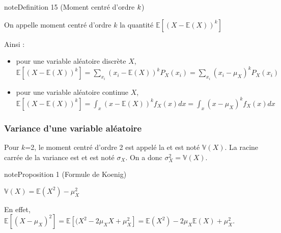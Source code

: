 \documentclass[letterpaper,10pt,french]{sphinxmanual}
\begin{document}
\ignorespaces \label{Rappels:definition-31}
\begin{sphinxadmonition}{note}{Definition 15 (Moment centré d’ordre \protect\(k\protect\))}



\sphinxAtStartPar
On appelle moment centré d’ordre \(k\) la quantité \(\mathbb{E}\left [(X-\mathbb{E}(X))^k \right]\)
\end{sphinxadmonition}

\sphinxAtStartPar
Ainsi :
\begin{itemize}
\item {} 
\sphinxAtStartPar
pour une variable aléatoire discrète \(X\), \(\mathbb{E}\left [(X-\mathbb{E}(X))^k \right] = \displaystyle\sum_{x_i} (x_i-\mathbb{E}(X))^k P_X(x_i) = \displaystyle\sum_{x_i} (x_i-\mu_X)^k P_X(x_i)\)

\item {} 
\sphinxAtStartPar
pour une variable aléatoire continue \(X\), \(\mathbb{E}\left [(X-\mathbb{E}(X))^k \right] = \int_x (x-\mathbb{E}(X))^k f_X(x)dx = \int_x (x-\mu_X)^k f_X(x)dx\)

\end{itemize}


\subsubsection{Variance d’une variable aléatoire}
\label{\detokenize{Rappels:variance-d-une-variable-aleatoire}}
\ignorespaces 
{}\ignorespaces 
\sphinxAtStartPar
Pour \(k\)=2, le moment centré d’ordre 2 est appelé la  et est noté \(\mathbb{V}(X)\). La racine carrée de la variance est  et est noté \(\sigma_X\). On a donc \(\sigma_X^2=\mathbb{V}(X)\).
\label{Rappels:proposition-32}
\begin{sphinxadmonition}{note}{Proposition 1 (Formule de Koenig)}



\sphinxAtStartPar
\(\mathbb{V}(X) = \mathbb{E}(X^2)-\mu_X^2\)
\end{sphinxadmonition}

\sphinxAtStartPar
En effet, \(\mathbb{E}\left [(X-\mu_X)^2 \right] = \mathbb{E}\left [(X^2-2\mu_XX+\mu_X^2 \right] = \mathbb{E}(X^2)-2\mu_X\mathbb{E}(X)+\mu_X^2\).
\end{document}
